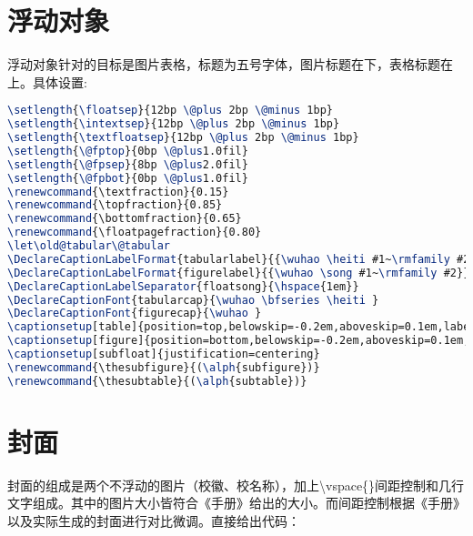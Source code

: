 \section{浮动对象}
浮动对象针对的目标是图片表格，标题为五号字体，图片标题在下，表格标题在上。具体设置:
\begin{lstlisting}[language=TeX]
\setlength{\floatsep}{12bp \@plus 2bp \@minus 1bp}
\setlength{\intextsep}{12bp \@plus 2bp \@minus 1bp}
\setlength{\textfloatsep}{12bp \@plus 2bp \@minus 1bp}
\setlength{\@fptop}{0bp \@plus1.0fil}
\setlength{\@fpsep}{8bp \@plus2.0fil}
\setlength{\@fpbot}{0bp \@plus1.0fil}
\renewcommand{\textfraction}{0.15}
\renewcommand{\topfraction}{0.85}
\renewcommand{\bottomfraction}{0.65}
\renewcommand{\floatpagefraction}{0.80}
\let\old@tabular\@tabular
\DeclareCaptionLabelFormat{tabularlabel}{{\wuhao \heiti #1~\rmfamily #2}}
\DeclareCaptionLabelFormat{figurelabel}{{\wuhao \song #1~\rmfamily #2}}
\DeclareCaptionLabelSeparator{floatsong}{\hspace{1em}}
\DeclareCaptionFont{tabularcap}{\wuhao \bfseries \heiti }
\DeclareCaptionFont{figurecap}{\wuhao }
\captionsetup[table]{position=top,belowskip=-0.2em,aboveskip=0.1em,labelformat=tabularlabel,labelsep=floatsong,font=tabularcap}
\captionsetup[figure]{position=bottom,belowskip=-0.2em,aboveskip=0.1em,labelformat=figurelabel,labelsep=floatsong,font=figurecap}
\captionsetup[subfloat]{justification=centering}
\renewcommand{\thesubfigure}{(\alph{subfigure})}
\renewcommand{\thesubtable}{(\alph{subtable})}
\end{lstlisting}

\section{封面}
\label{sec:cover}
封面的组成是两个不浮动的图片（校徽、校名称），加上\textbackslash vspace\{\}间距控制和几行文字组成。其中的图片大小皆符合《手册》给出的大小。而间距控制根据《手册》以及实际生成的封面进行对比微调。直接给出代码：

